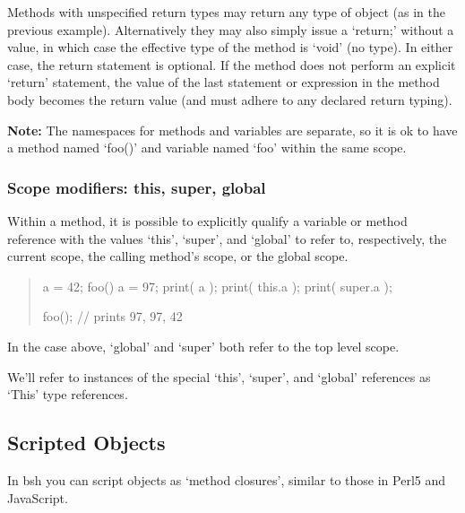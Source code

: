 \documentclass[twoside,11pt,nolof]{starlink}
\begin{document}
Methods with unspecified return types may return any type of object (as in
the previous example).
Alternatively they may also simply issue a `return;' without a value, in
which case the effective type of the method is `void' (no type).  In
either case, the return statement is optional.  If the method does not
perform an explicit `return' statement, the value of the last statement or
expression in the method body becomes the return value (and must adhere
to any declared return typing).

\textbf{Note:}
The namespaces for methods and variables are separate, so
it is ok to have a method named `foo()' and variable named `foo' within
the same scope.

\subsubsection{Scope modifiers: this, super, global}
Within a method, it is possible to explicitly qualify a variable or
method reference with the values `this', `super', and `global' to
refer to, respectively, the current scope, the calling method's scope,
or the global scope.
\begin{quote}
\begin{terminalv}
    a = 42;
    foo() {
        a = 97;
        print( a );
        print( this.a );
        print( super.a );
    }

    foo();  // prints 97, 97, 42
\end{terminalv}
\end{quote}
In the case above, `global' and `super' both refer to the top level scope.

We'll refer to instances of the special `this', `super', and `global'
references as `This' type references.

\subsection{Scripted Objects}

In bsh you can script objects as `method closures', similar to
those in Perl5 and JavaScript.
\end{document}
